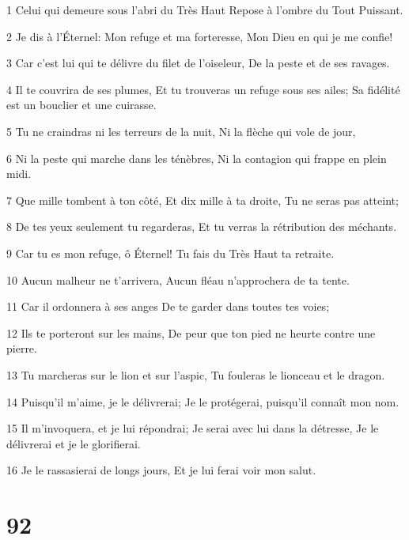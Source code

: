 \par 1 Celui qui demeure sous l'abri du Très Haut Repose à l'ombre du Tout Puissant.
\par 2 Je dis à l'Éternel: Mon refuge et ma forteresse, Mon Dieu en qui je me confie!
\par 3 Car c'est lui qui te délivre du filet de l'oiseleur, De la peste et de ses ravages.
\par 4 Il te couvrira de ses plumes, Et tu trouveras un refuge sous ses ailes; Sa fidélité est un bouclier et une cuirasse.
\par 5 Tu ne craindras ni les terreurs de la nuit, Ni la flèche qui vole de jour,
\par 6 Ni la peste qui marche dans les ténèbres, Ni la contagion qui frappe en plein midi.
\par 7 Que mille tombent à ton côté, Et dix mille à ta droite, Tu ne seras pas atteint;
\par 8 De tes yeux seulement tu regarderas, Et tu verras la rétribution des méchants.
\par 9 Car tu es mon refuge, ô Éternel! Tu fais du Très Haut ta retraite.
\par 10 Aucun malheur ne t'arrivera, Aucun fléau n'approchera de ta tente.
\par 11 Car il ordonnera à ses anges De te garder dans toutes tes voies;
\par 12 Ils te porteront sur les mains, De peur que ton pied ne heurte contre une pierre.
\par 13 Tu marcheras sur le lion et sur l'aspic, Tu fouleras le lionceau et le dragon.
\par 14 Puisqu'il m'aime, je le délivrerai; Je le protégerai, puisqu'il connaît mon nom.
\par 15 Il m'invoquera, et je lui répondrai; Je serai avec lui dans la détresse, Je le délivrerai et je le glorifierai.
\par 16 Je le rassasierai de longs jours, Et je lui ferai voir mon salut.

\chapter{92}

